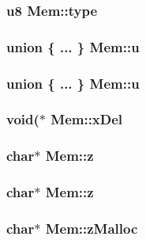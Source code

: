 \subsubsection{\setlength{\rightskip}{0pt plus 5cm}\bf{u8} \bf{Mem::type}}\label{structMem_240b404ea1db2f06991b25af5d269dd2}


\subsubsection{\setlength{\rightskip}{0pt plus 5cm}union \{ ... \}   \bf{Mem::u}}\label{structMem_a666b0bc1a631713157664ecff758c65}


\subsubsection{\setlength{\rightskip}{0pt plus 5cm}union \{ ... \}   \bf{Mem::u}}\label{structMem_cb903424c509d0350a9c512f2fc20db5}


\subsubsection{\setlength{\rightskip}{0pt plus 5cm}void($\ast$ \bf{Mem::x\-Del}}\label{structMem_fe57750185495ba49585a64d473b5086}


\subsubsection{\setlength{\rightskip}{0pt plus 5cm}char$\ast$ \bf{Mem::z}}\label{structMem_8680db957f4d8866a3277b215411f399}


\subsubsection{\setlength{\rightskip}{0pt plus 5cm}char$\ast$ \bf{Mem::z}}\label{structMem_8680db957f4d8866a3277b215411f399}


\subsubsection{\setlength{\rightskip}{0pt plus 5cm}char$\ast$ \bf{Mem::z\-Malloc}}\label{structMem_fd3e60e9ad543d070d8c3ae8ec671586}


